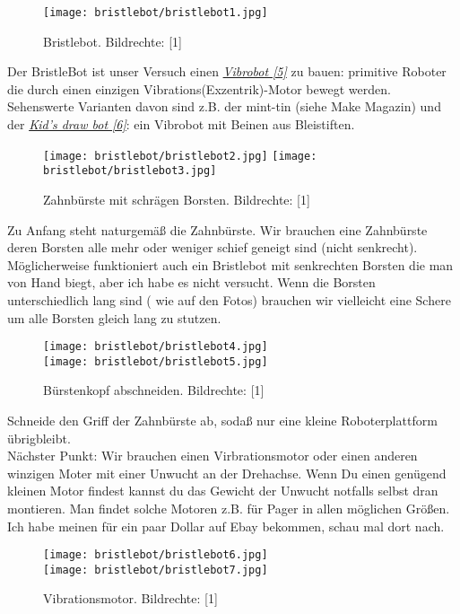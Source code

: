 \documentclass[10pt,a4paper,ngerman,twoside]{article} %
\begin{document}
\begin{figure}
\texttt{[image: bristlebot/bristlebot1.jpg]}\\
\caption{Bristlebot. Bildrechte: [1]}
\end{figure}

Der BristleBot ist unser Versuch einen \href{http://makezine.com/projects/make-10/vibrobots/}{\textit{Vibrobot [5]}} zu bauen: primitive Roboter die durch einen einzigen Vibrations(Exzentrik)-Motor bewegt werden. Sehenswerte Varianten davon sind z.B. der mint-tin (siehe Make Magazin) und der \href{http://www.finkbuilt.com/blog/kids-art-bot/}{\textit{Kid's draw bot [6]}}: ein Vibrobot mit Beinen aus Bleistiften. \\
 
\begin{figure}
\texttt{[image: bristlebot/bristlebot2.jpg]}
\texttt{[image: bristlebot/bristlebot3.jpg]}\\
\caption{Zahnbürste mit schrägen Borsten. Bildrechte: [1]}
\end{figure}

Zu Anfang steht naturgemäß die Zahnbürste. Wir brauchen eine Zahnbürste deren Borsten alle mehr oder weniger schief geneigt sind (nicht senkrecht). Möglicherweise funktioniert auch ein Bristlebot mit senkrechten Borsten die man von Hand biegt, aber ich habe es nicht versucht. Wenn die Borsten unterschiedlich lang sind ( wie auf den Fotos) brauchen wir vielleicht eine Schere um alle Borsten gleich lang zu stutzen. \\
 
\begin{figure}
\texttt{[image: bristlebot/bristlebot4.jpg]}\\
\texttt{[image: bristlebot/bristlebot5.jpg]}\\
\caption{Bürstenkopf abschneiden. Bildrechte: [1]}
\end{figure}

Schneide den Griff der Zahnbürste ab, sodaß nur eine kleine Roboterplattform übrigbleibt. \\ 

Nächster Punkt: Wir brauchen einen Virbrationsmotor oder einen anderen winzigen Moter mit einer Unwucht an der Drehachse. Wenn Du einen genügend kleinen Motor findest kannst du das Gewicht der Unwucht notfalls selbst dran montieren. Man findet solche Motoren z.B. für Pager in allen möglichen Größen. Ich habe meinen für ein paar Dollar auf Ebay bekommen, schau mal dort nach.
\\
\begin{figure}
\texttt{[image: bristlebot/bristlebot6.jpg]}\\
\texttt{[image: bristlebot/bristlebot7.jpg]}\\
\caption{Vibrationsmotor. Bildrechte: [1]}
\end{figure}
\end{document}
